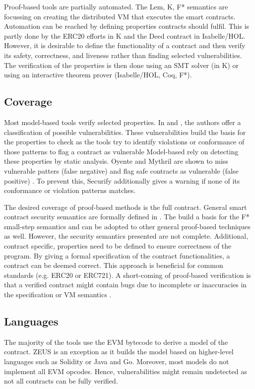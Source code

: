 Proof-based tools are partially automated. The Lem, K, F* semantics are focussing on creating the distributed VM that executes the smart contracts. Automation can be reached by defining properties contracts should fulfil. This is partly done by the ERC20 efforts in K and the Deed contract in Isabelle/HOL. However, it is desirable to define the functionality of a contract and then verify its safety, correctness, and liveness rather than finding selected vulnerabilities. The verification of the properties is then done using an SMT solver (in K) or using an interactive theorem prover (Isabelle/HOL, Coq, F*).

\subsection{Coverage} Most model-based tools verify selected properties. In \cite{Atzei2017} and \cite{Luu2016}, the authors offer a classification of possible vulnerabilities. These vulnerabilities build the basis for the properties to check as the tools try to identify violations or conformance of those patterns to flag a contract as vulnerable
Model-based rely on detecting these properties by static analysis. 
Oyente and Mythril are shown to miss vulnerable patters (false negative) and flag safe contracts as vulnerable (false positive) \cite{Tsankov2017}.
To prevent this, Securify additionally gives a warning if none of its conformance or violation patterns matches.

The desired coverage of proof-based methods is the full contract. 
General smart contract security semantics are formally defined in \cite{Grishchenko2018}. The build a basis for the F* small-step semantics and can be adopted to other general proof-based techniques as well.
However, the security semantics presented are not complete.
Additional, contract specific, properties need to be defined to ensure correctness of the program.
By giving a formal specification of the contract functionalities, a contract can be deemed correct. This approach is beneficial for common standards (e.g. ERC20 or ERC721). A short-coming of proof-based verification is that a verified contract might contain bugs due to incomplete or inaccuracies in the specification or VM semantics \cite{Hirai2016}.

\subsection{Languages} 
The majority of the tools use the EVM bytecode to derive a model of the contract. ZEUS is an exception as it builds the model based on higher-level languages such as Solidity or Java and Go. Moreover, most models do not implement all EVM opcodes. Hence, vulnerabilities might remain undetected as not all contracts can be fully verified.

